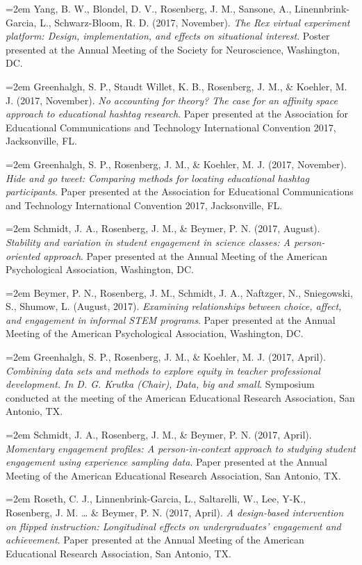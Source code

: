 \documentclass[
  14,
]{article}
\begin{document}
\hangindent=2em Yang, B. W., Blondel, D. V., Rosenberg, J. M., Sansone,
A., Linennbrink-Garcia, L., Schwarz-Bloom, R. D. (2017, November).
\emph{The Rex virtual experiment platform: Design, implementation, and
effects on situational interest}. Poster presented at the Annual Meeting
of the Society for Neuroscience, Washington, DC.

\hangindent=2em Greenhalgh, S. P., Staudt Willet, K. B., Rosenberg, J.
M., \& Koehler, M. J. (2017, November). \emph{No accounting for theory?
The case for an affinity space approach to educational hashtag
research}. Paper presented at the Association for Educational
Communications and Technology International Convention 2017,
Jacksonville, FL.

\hangindent=2em Greenhalgh, S. P., Rosenberg, J. M., \& Koehler, M. J.
(2017, November). \emph{Hide and go tweet: Comparing methods for
locating educational hashtag participants}. Paper presented at the
Association for Educational Communications and Technology International
Convention 2017, Jacksonville, FL.

\hangindent=2em Schmidt, J. A., Rosenberg, J. M., \& Beymer, P. N.
(2017, August). \emph{Stability and variation in student engagement in
science classes: A person-oriented approach}. Paper presented at the
Annual Meeting of the American Psychological Association, Washington,
DC.

\hangindent=2em Beymer, P. N., Rosenberg, J. M., Schmidt, J. A.,
Naftzger, N., Sniegowski, S., Shumow, L. (August, 2017). \emph{Examining
relationships between choice, affect, and engagement in informal STEM
programs}. Paper presented at the Annual Meeting of the American
Psychological Association, Washington, DC.

\hangindent=2em Greenhalgh, S. P., Rosenberg, J. M., \& Koehler, M. J.
(2017, April). \emph{Combining data sets and methods to explore equity
in teacher professional development. In D. G. Krutka (Chair), Data, big
and small}. Symposium conducted at the meeting of the American
Educational Research Association, San Antonio, TX.

\hangindent=2em Schmidt, J. A., Rosenberg, J. M., \& Beymer, P. N.
(2017, April). \emph{Momentary engagement profiles: A person-in-context
approach to studying student engagement using experience sampling data}.
Paper presented at the Annual Meeting of the American Educational
Research Association, San Antonio, TX.

\hangindent=2em Roseth, C. J., Linnenbrink-Garcia, L., Saltarelli, W.,
Lee, Y-K., Rosenberg, J. M. \ldots{} \& Beymer, P. N. (2017, April).
\emph{A design-based intervention on flipped instruction: Longitudinal
effects on undergraduates' engagement and achievement}. Paper presented
at the Annual Meeting of the American Educational Research Association,
San Antonio, TX.
\end{document}
